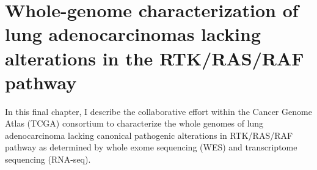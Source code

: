 \documentclass[phd,tocprelim]{cornell}
\begin{document}



\chapter{Whole-genome characterization of lung adenocarcinomas lacking alterations in the RTK/RAS/RAF pathway} \label{chap:gdan}

In this final chapter, I describe the collaborative effort within the Cancer Genome Atlas (TCGA) consortium to characterize the whole genomes of lung adenocarcinoma lacking canonical pathogenic alterations in RTK/RAS/RAF pathway as determined by whole exome sequencing (WES) and transcriptome sequencing (RNA-seq).
\end{document}
